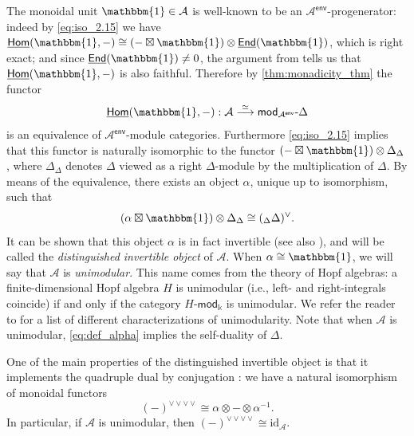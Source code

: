 \documentclass[11pt]{article}
\theoremstyle{definition}
\begin{document}
The monoidal unit $\mathbbm{1} \in \mathcal{A}$ is well-known to be an $\mathcal{A}^\mathsf{env}$-progenerator: indeed by \eqref{eq:iso_2.15} we have $\underline{\mathsf{Hom}}(\mathbbm{1},-)\cong (- \boxtimes \mathbbm{1}) \otimes
\underline{\mathsf{End}}(\mathbbm{1})$, which is right exact; and  since $\underline{\mathsf{End}}(\mathbbm{1})\neq 0$, the argument from \cite[Lemma~6.11]{reflection} tells us that  $\underline{\mathsf{Hom}}(\mathbbm{1},-)$ is also faithful.
Therefore by \cref{thm:monadicity_thm} the functor $$ \underline{\mathsf{Hom}}(\mathbbm{1},-): \mathcal{A} \overset{\simeq}{\longrightarrow} \mathsf{mod}_{\mathcal{A}^\mathsf{env}}\text{-} \Delta $$
is an equivalence of $\mathcal{A}^\mathsf{env}$-module categories. Furthermore \eqref{eq:iso_2.15} implies that this functor is naturally isomorphic to the functor $(- \boxtimes \mathbbm{1}) \otimes \Delta_{\Delta}$, where $\Delta_{\Delta}$ denotes $\Delta$ viewed as a right $\Delta$-module by the multiplication of $\Delta$. By means of the equivalence, there exists an object $\alpha$, unique up to isomorphism, such that
\begin{equation}\label{eq:def_alpha}
(\alpha \boxtimes \mathbbm{1}) \otimes \Delta_\Delta \cong ({}_{\Delta}\Delta)^\vee.
\end{equation}
 It can be shown that this object $\alpha$ is in fact invertible \cite[\S 7.18]{egno} (see also \cite[Lemma 4.3]{shimizuunimodular}), and will be called the \emph{distinguished invertible object} of  $\mathcal{A}$. When $\alpha \cong \mathbbm{1}$, we will say that $\mathcal{A}$ is \emph{unimodular}. This name comes from the theory of Hopf algebras: a finite-dimensional Hopf algebra $H$ is unimodular  (i.e., left- and right-integrals coincide) if and only if the category $H\text{-}\mathsf{mod}_\Bbbk$ is unimodular. We refer the reader to \cite[Theorem 4.10]{shimizuunimodular} for a list of different characterizations of unimodularity.  Note that when $\mathcal{A}$ is unimodular, \eqref{eq:def_alpha} implies the self-duality of $\Delta$.


One of the main properties of the distinguished invertible object is that it implements the quadruple dual by conjugation \cite[Theorem 3.3]{eno-d}: we have a natural 
isomorphism of monoidal functors
\begin{equation}
 (-)^{\vee \vee \vee \vee} \cong \alpha \otimes - \otimes \alpha^{-1}. 
\end{equation} In particular, if $\mathcal{A}$ is unimodular, then $(-)^{\vee \vee \vee \vee} \cong \mathrm{id}_\mathcal{A}$.
\end{document}
